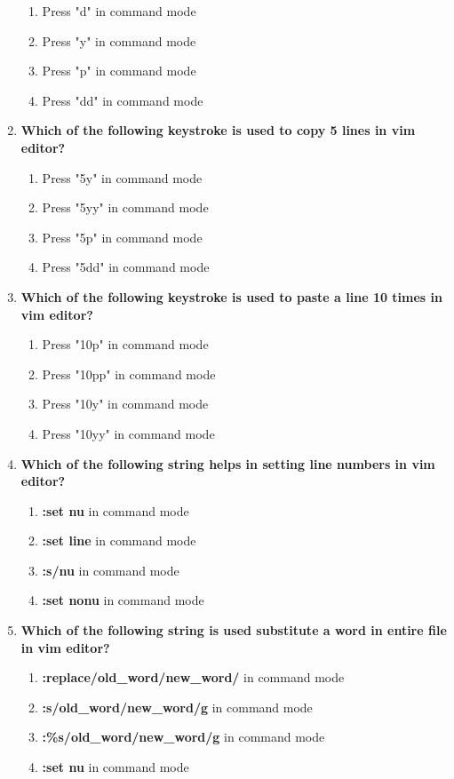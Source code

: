 \begin{flushleft}
\begin{enumerate}
\begin{enumerate}[label=(\alph*)]
			\item Press "d" in command mode      
			\item Press "y" in command mode      
			\item Press "p" in command mode      
			\item Press "dd" in command mode        %
		\end{enumerate}
		\bigskip
		\bigskip
		\item \textbf{Which of the following keystroke is used to copy 5 lines in vim editor?}
		\begin{enumerate}[label=(\alph*)]
			\item Press "5y" in command mode      
			\item Press "5yy" in command mode        %
			\item Press "5p" in command mode      
			\item Press "5dd" in command mode     
		\end{enumerate}	
		\bigskip
		\bigskip
		\item \textbf{Which of the following keystroke is used to paste a line 10 times in vim editor?}
		\begin{enumerate}[label=(\alph*)]
			\item Press "10p" in command mode      
			\item Press "10pp" in command mode        %
			\item Press "10y" in command mode      
			\item Press "10yy" in command mode     
		\end{enumerate}	
		\bigskip
		\bigskip
		\item \textbf{Which of the following string helps in setting line numbers in vim editor?}
		\begin{enumerate}[label=(\alph*)]
			\item \textbf{:set nu} in command mode   %
			\item \textbf{:set line} in command mode   
			\item \textbf{:s/nu} in command mode  
			\item \textbf{:set nonu} in command mode  
		\end{enumerate}
		\bigskip
		\bigskip
		\item \textbf{Which of the following string is used substitute a word in entire file in vim editor?}
		\begin{enumerate}[label=(\alph*)]
			\item \textbf{:replace/old\_word/new\_word/} in command mode   
			\item \textbf{:s/old\_word/new\_word/g} in command mode 
			\item \textbf{:\%s/old\_word/new\_word/g} in command mode    %
			\item \textbf{:set nu} in command mode  
		\end{enumerate}
	\end{enumerate}
	
	
\end{flushleft}
\newpage

\afterpage{\blankpage}
